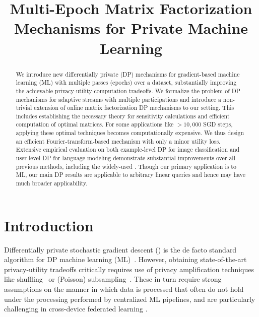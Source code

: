 \documentclass{article} %
\title{Multi-Epoch Matrix Factorization\\Mechanisms for Private Machine Learning}
\theoremstyle{named}
\begin{document}
 

\printAffiliationsAndNotice{}


\begin{abstract}
We introduce new differentially private (DP) mechanisms for gradient-based machine learning (ML) with multiple passes (epochs) over a dataset, substantially improving the achievable privacy-utility-computation tradeoffs. We formalize the problem of DP mechanisms for adaptive streams with multiple participations and introduce a non-trivial extension of online matrix factorization DP mechanisms to our setting. This includes establishing the necessary theory for sensitivity calculations and efficient computation of optimal matrices.
For some applications like $>\!\! 10,000$ SGD steps, applying these optimal techniques becomes computationally expensive. We thus design an efficient Fourier-transform-based mechanism with only a minor utility loss.
Extensive empirical evaluation on both example-level DP for image classification and user-level DP for language modeling demonstrate substantial improvements over all previous methods, including the widely-used \DPSGD . Though our primary application is to ML, our main DP results are applicable to arbitrary linear queries and hence may have much broader applicability.

\end{abstract}

\section{Introduction}\label{sec:intro}


Differentially private stochastic gradient descent (\DPSGD) is the de facto standard algorithm for DP machine learning (ML)~\citep{song2013stochastic,BST14,abadi2016deep}. However, obtaining state-of-the-art privacy-utility tradeoffs critically requires use of privacy amplification techniques like shuffling~\citep{erlingsson2019amplification,feldman2022hiding} or (Poisson) subsampling~\citep{BST14,zhu2019poission,WangBK19}. These in turn require strong assumptions on the manner in which data is processed that often do not hold under the processing performed by centralized ML pipelines, and are particularly challenging in cross-device federated learning \citep{kairouz2021practical}.
\end{document}
